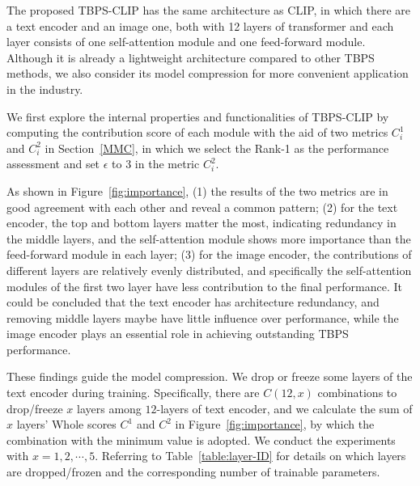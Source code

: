 \documentclass[letterpaper]{article} %
\begin{document}
The proposed TBPS-CLIP has the same architecture as CLIP, in which there are a text encoder and an image one, both with 12 layers of transformer and each layer consists of one self-attention module and one feed-forward module.
Although it is already a lightweight architecture compared to other TBPS methods, we also consider its model compression for more convenient application in the industry.

We first explore the internal properties and functionalities of TBPS-CLIP by computing the contribution score of each module with the aid of two metrics $C^{\mathrm{1}}_i$ and $C^{\mathrm{2}}_i$ in Section~\ref{MMC}, in which we select the Rank-1 as the performance assessment and set $\epsilon$ to $3$ in the metric $C^{\mathrm{2}}_i$.

As shown in Figure~\ref{fig:importance}, (1)  the results of the two metrics are in good agreement with each other and reveal a common pattern; (2) for the text encoder, the top and bottom layers matter the most, indicating redundancy in the middle layers, and the self-attention module shows more importance than the feed-forward module in each layer; (3) for the image encoder, the contributions of different layers are relatively evenly distributed, and specifically the self-attention modules of the first two layer have less contribution to the final performance.
It could be concluded that the text encoder has architecture redundancy, and removing middle layers maybe have little influence over performance, while the image encoder plays an essential role in achieving outstanding TBPS performance. 

These findings guide the model compression.
We drop or freeze some layers of the text encoder during training.
Specifically, there are $C(12,x)$ combinations to drop/freeze $x$ layers among $12$-layers of text encoder, and we calculate the sum of $x$ layers' Whole scores $C^1$ and $C^2$ in Figure~\ref{fig:importance}, by which the combination with the minimum value is adopted.
We conduct the experiments with $x=1,2, \cdots, 5$.
Referring to Table~\ref{table:layer-ID} for details on which layers are dropped/frozen and the corresponding number of trainable parameters.
\end{document}
